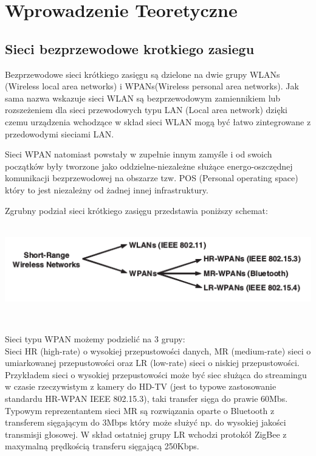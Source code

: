 \section{Wprowadzenie Teoretyczne}

\subsection{Sieci bezprzewodowe krotkiego zasiegu}

\par
\tab Bezprzewodowe sieci krótkiego zasięgu są dzielone na dwie grupy WLANs (Wireless local area networks) i WPANs(Wireless personal area networks). Jak sama nazwa wskazuje sieci WLAN są bezprzewodowym zamiennikiem lub rozszeżeniem dla sieci przewodowych typu LAN (Local area network) dzięki czemu urządzenia wchodzące w skład sieci WLAN mogą być łatwo zintegrowane z przedowodymi sieciami LAN.
\\
\par
Sieci WPAN natomiast powstały w zupełnie innym zamyśle i od swoich początków były tworzone jako oddzielne-niezależne służące energo-oszczędnej komunikacji bezprzewodowej na obszarze tzw. POS (Personal operating space) który to jest niezależny od żadnej innej infrastruktury.
\\
\par
Zgrubny podział sieci krótkiego zasięgu przedstawia poniższy schemat:\\
\\
\centerline{\includegraphics[scale=0.5]{./img/img_0__2_1}}
\\
\par 
Sieci typu WPAN możemy podzielić na 3 grupy: \\
\tab Sieci HR (high-rate) o wysokiej przepustowości danych, MR (medium-rate) sieci o umiarkowanej przepustowości oraz LR (low-rate) sieci o niskiej przepustowości. \\
\tab Przykładem sieci o wysokiej przepustowości może być siec służąca do streamingu w czasie rzeczywistym z kamery do HD-TV (jest to typowe zastosowanie standardu HR-WPAN IEEE 802.15.3), taki transfer sięga do prawie 60Mbs. Typowym reprezentantem sieci MR są rozwiązania oparte o Bluetooth z transferem sięgającym do 3Mbps który może służyć np. do wysokiej jakości transmisji głosowej. W skład ostatniej grupy LR wchodzi protokół ZigBee z maxymalną prędkością transferu sięgającą 250Kbps. \\


\clearpage
